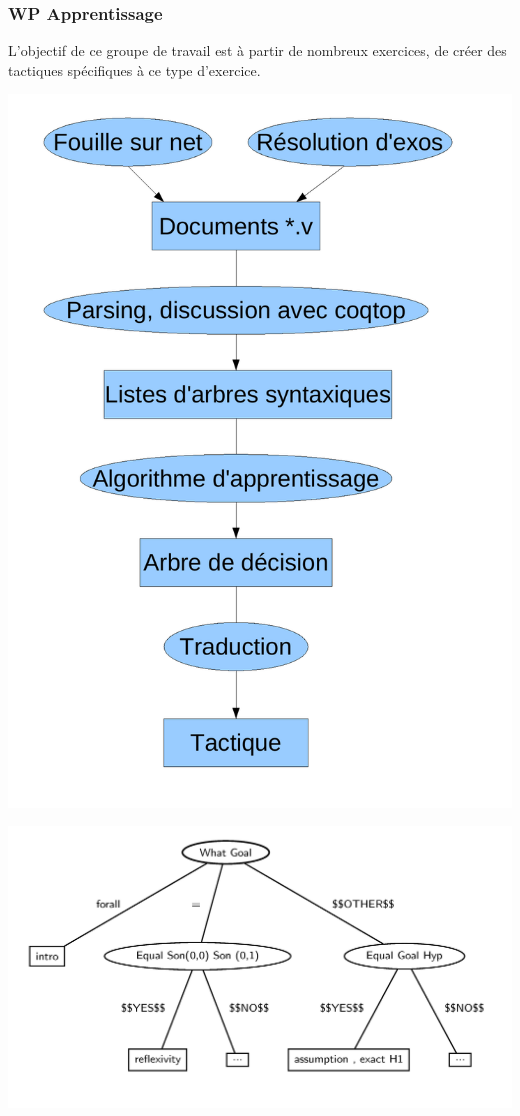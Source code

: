 \begin{frame}
\frametitle{WP Apprentissage} 
\begin{minipage}{6cm}
L'objectif de ce groupe de travail est à partir de nombreux exercices, de créer des tactiques spécifiques à ce type d'exercice.
\end{minipage}
\begin{minipage}{4cm}
\includegraphics[scale=0.2]{../images/apprentissage/organisation_apprentissage.pdf}
\end{minipage}

\end{frame}
\begin{frame}


\includegraphics{../images/apprentissage/decision_tree.jpg}

\end{frame}


